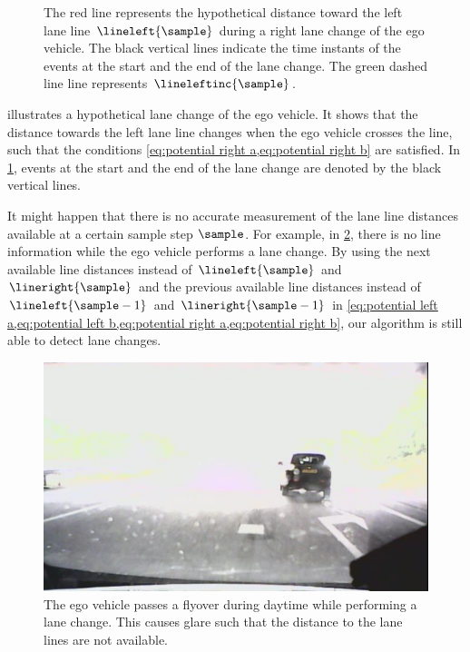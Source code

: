 \setlength{\figurewidth}{\linewidth}
\setlength{\figureheight}{0.6\linewidth}
\begin{figure}
	\centering
	
	\caption{The red line represents the hypothetical distance toward the left lane line $\lineleft{\sample}$ during a right lane change of the ego vehicle. The black vertical lines indicate the time instants of the events at the start and the end of the lane change. The green dashed line line represents $\lineleftinc{\sample}$.}
	\label{fig:ego lane change}
\end{figure}

 illustrates a hypothetical lane change of the ego vehicle. 
It shows that the distance towards the left lane line changes when the ego vehicle crosses the line, such that the conditions \cref{eq:potential right a,eq:potential right b} are satisfied. In \cref{fig:ego lane change}, events at the start and the end of the lane change are denoted by the black vertical lines.

\begin{remark}
	It might happen that there is no accurate measurement of the lane line distances available at a certain sample step $\sample$. For example, in \cref{fig:glare}, there is no line information while the ego vehicle performs a lane change. By using the next available line distances instead of $\lineleft{\sample}$ and $\lineright{\sample}$ and the previous available line distances instead of $\lineleft{\sample-1}$ and $\lineright{\sample-1}$ in \cref{eq:potential left a,eq:potential left b,eq:potential right a,eq:potential right b}, our algorithm is still able to detect lane changes.
\end{remark}

\begin{figure}
	\centering
	\includegraphics[width=\linewidth]{figures/glare}
	\caption{The ego vehicle passes a flyover during daytime while performing a lane change. This causes glare such that the distance to the lane lines are not available. 
		}
	\label{fig:glare}
\end{figure}



